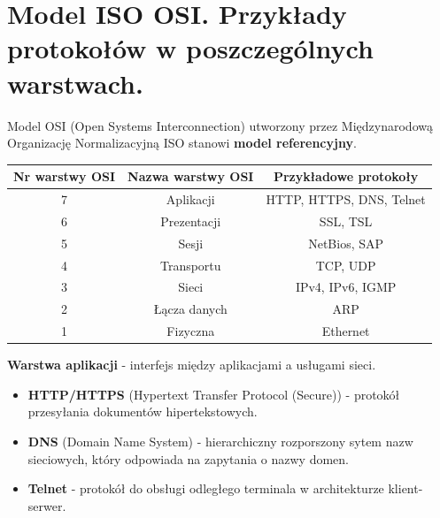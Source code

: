 \documentclass[12pt]{article}
\begin{document}
    \newpage

    \section{Model ISO OSI. Przykłady protokołów w poszczególnych warstwach.}
    Model OSI (Open Systems Interconnection) utworzony przez Międzynarodową Organizację Normalizacyjną ISO stanowi
    \textbf{model referencyjny}.

    \begin{table}[H]
        \begin{center}
            \begin{tabular}{|c|c|c| }
                \hline
                \textbf{Nr warstwy OSI} & \textbf{Nazwa warstwy OSI} & \textbf{Przykładowe protokoły}\\
                \hline
                \hline
                7 & Aplikacji & HTTP, HTTPS, DNS, Telnet\\
                \hline
                6 & Prezentacji & SSL, TSL\\
                \hline
                5 & Sesji & NetBios, SAP\\
                \hline
                4 & Transportu & TCP, UDP\\
                \hline
                3 & Sieci & IPv4, IPv6, IGMP\\
                \hline
                2 & Łącza danych & ARP\\
                \hline
                1 & Fizyczna & Ethernet\\
                \hline
            \end{tabular}
        \end{center}
    \end{table}

    \noindent \textbf{Warstwa aplikacji} - interfejs między aplikacjami a
    usługami sieci.
    \begin{itemize}
        \item \textbf{HTTP/HTTPS} (Hypertext Transfer Protocol (Secure)) - protokół przesyłania dokumentów hipertekstowych.
        \item \textbf{DNS} (Domain Name System) - hierarchiczny rozporszony sytem nazw sieciowych, który odpowiada na zapytania
        o nazwy domen.
        \item \textbf{Telnet} - protokół do obsługi odległego terminala w architekturze klient-serwer.
    \end{itemize}
\end{document}
